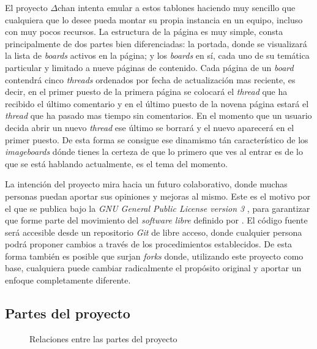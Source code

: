 \documentclass[12pt,a4paper,titlepage]{article}
\newcommand\projectname{$\Delta$chan}
\begin{document}
    El proyecto {\projectname} intenta emular a estos tablones haciendo muy sencillo que cualquiera que lo desee pueda montar su propia instancia en un equipo, incluso con muy pocos recursos. La estructura de la página es muy simple, consta principalmente de dos partes bien diferenciadas: la portada, donde se visualizará la lista de \textit{boards} activos en la página; y los \textit{boards} en sí, cada uno de su temática particular y limitado a nueve páginas de contenido. Cada página de un \textit{board} contendrá cinco \textit{threads} ordenados por fecha de actualización mas reciente, es decir, en el primer puesto de la primera página se colocará el \textit{thread} que ha recibido el último comentario y en el último puesto de la novena página estará el \textit{thread} que ha pasado mas tiempo sin comentarios. En el momento que un usuario decida abrir un nuevo \textit{thread} ese último se borrará y el nuevo aparecerá en el primer puesto. De esta forma se consigue ese dinamismo tán característico de los \textit{imageboards} dónde tienes la certeza de que lo primero que ves al entrar es de lo que se está hablando actualmente, es el tema del momento.

    La intención del proyecto mira hacia un futuro colaborativo, donde muchas personas puedan aportar sus opiniones y mejoras al mismo. Este es el motivo por el que se publica bajo la \emph{GNU General Public License version 3} \cite{gnugplv3}, para garantizar que forme parte del movimiento del \emph{software libre} definido por \textcite{libresoftwaredefinition}. El código fuente será accesible desde un repositorio \emph{Git} de libre acceso, donde cualquier persona podrá proponer cambios a través de los procedimientos establecidos. De esta forma también es posible que surjan \textit{forks} \cite{wiki:fork} donde, utilizando este proyecto como base, cualquiera puede cambiar radicalmente el propósito original y aportar un enfoque completamente diferente.

    \subsection{Partes del proyecto}

    \begin{figure}[ht]
        \centering
        \caption{Relaciones entre las partes del proyecto}\bigskip
        \label{project:schema}
        \shorthandoff{>}\shorthandoff{<}
        \shorthandon{>}\shorthandon{<}
    \end{figure}
\end{document}
